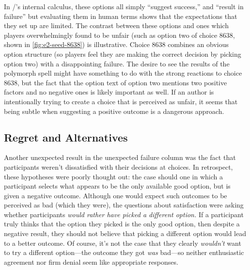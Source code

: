 In \dunyazad/'s internal calculus, these options all simply ``suggest success,'' and ``result in failure'' but evaluating them in human terms shows that the expectations that they set up are limited.
%
The contrast between these options and ones which players overwhelmingly found to be unfair (such as option two of choice 8638, shown in \cref{fig:e2-seed-8638}) is illustrative.
%
Choice 8638 combines an obvious option structure (so players feel they are making the correct decision by picking option two) with a disappointing failure.
%
The desire to see the results of the polymorph spell might have something to do with the strong reactions to choice 8638, but the fact that the option text of option two mentions two positive factors and no negative ones is likely important as well.
%
If an author is intentionally trying to create a choice that is perceived as unfair, it seems that being subtle when suggesting a positive outcome is a dangerous approach.


\subsection{Regret and Alternatives}
\label{sec:results-about-regret}

Another unexpected result in the unexpected failure column was the fact that participants weren't dissatisfied with their decisions at \obvf{} choices.
%
In retrospect, these hypotheses were poorly thought out: the \obvfm{} case should one in which a participant selects what appears to be the only available good option, but is given a negative outcome.
%
Although one would expect such outcomes to be perceived as bad (which they were), the questions about satisfaction were asking whether participants \emph{would rather have picked a different option.}
%
If a participant truly thinks that the option they picked is the only good option, then despite a negative result, they should not believe that picking a different option would lead to a better outcome.
%
Of course, it's not the case that they clearly \emph{wouldn't} want to try a different option---the outcome they got \emph{was} bad---so neither enthusiastic agreement nor firm denial seem like appropriate responses.



